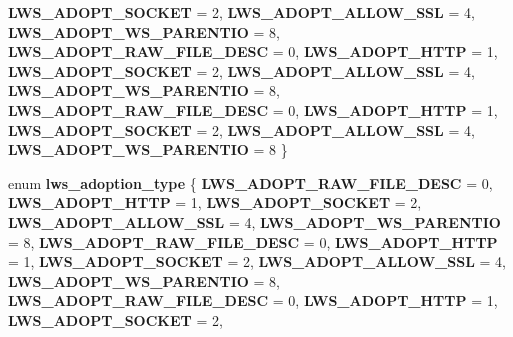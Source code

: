 \begin{DoxyCompactItemize}
{\bfseries L\+W\+S\+\_\+\+A\+D\+O\+P\+T\+\_\+\+S\+O\+C\+K\+ET} = 2, 
{\bfseries L\+W\+S\+\_\+\+A\+D\+O\+P\+T\+\_\+\+A\+L\+L\+O\+W\+\_\+\+S\+SL} = 4, 
{\bfseries L\+W\+S\+\_\+\+A\+D\+O\+P\+T\+\_\+\+W\+S\+\_\+\+P\+A\+R\+E\+N\+T\+IO} = 8, 
\newline
{\bfseries L\+W\+S\+\_\+\+A\+D\+O\+P\+T\+\_\+\+R\+A\+W\+\_\+\+F\+I\+L\+E\+\_\+\+D\+E\+SC} = 0, 
{\bfseries L\+W\+S\+\_\+\+A\+D\+O\+P\+T\+\_\+\+H\+T\+TP} = 1, 
{\bfseries L\+W\+S\+\_\+\+A\+D\+O\+P\+T\+\_\+\+S\+O\+C\+K\+ET} = 2, 
{\bfseries L\+W\+S\+\_\+\+A\+D\+O\+P\+T\+\_\+\+A\+L\+L\+O\+W\+\_\+\+S\+SL} = 4, 
\newline
{\bfseries L\+W\+S\+\_\+\+A\+D\+O\+P\+T\+\_\+\+W\+S\+\_\+\+P\+A\+R\+E\+N\+T\+IO} = 8, 
{\bfseries L\+W\+S\+\_\+\+A\+D\+O\+P\+T\+\_\+\+R\+A\+W\+\_\+\+F\+I\+L\+E\+\_\+\+D\+E\+SC} = 0, 
{\bfseries L\+W\+S\+\_\+\+A\+D\+O\+P\+T\+\_\+\+H\+T\+TP} = 1, 
{\bfseries L\+W\+S\+\_\+\+A\+D\+O\+P\+T\+\_\+\+S\+O\+C\+K\+ET} = 2, 
\newline
{\bfseries L\+W\+S\+\_\+\+A\+D\+O\+P\+T\+\_\+\+A\+L\+L\+O\+W\+\_\+\+S\+SL} = 4, 
{\bfseries L\+W\+S\+\_\+\+A\+D\+O\+P\+T\+\_\+\+W\+S\+\_\+\+P\+A\+R\+E\+N\+T\+IO} = 8
 \}
\item 
\mbox{\label{group__sock-adopt_ga7e944a23efbb50187d34c62fb841d071}} 
enum {\bfseries lws\+\_\+adoption\+\_\+type} \{ \newline
{\bfseries L\+W\+S\+\_\+\+A\+D\+O\+P\+T\+\_\+\+R\+A\+W\+\_\+\+F\+I\+L\+E\+\_\+\+D\+E\+SC} = 0, 
{\bfseries L\+W\+S\+\_\+\+A\+D\+O\+P\+T\+\_\+\+H\+T\+TP} = 1, 
{\bfseries L\+W\+S\+\_\+\+A\+D\+O\+P\+T\+\_\+\+S\+O\+C\+K\+ET} = 2, 
{\bfseries L\+W\+S\+\_\+\+A\+D\+O\+P\+T\+\_\+\+A\+L\+L\+O\+W\+\_\+\+S\+SL} = 4, 
\newline
{\bfseries L\+W\+S\+\_\+\+A\+D\+O\+P\+T\+\_\+\+W\+S\+\_\+\+P\+A\+R\+E\+N\+T\+IO} = 8, 
{\bfseries L\+W\+S\+\_\+\+A\+D\+O\+P\+T\+\_\+\+R\+A\+W\+\_\+\+F\+I\+L\+E\+\_\+\+D\+E\+SC} = 0, 
{\bfseries L\+W\+S\+\_\+\+A\+D\+O\+P\+T\+\_\+\+H\+T\+TP} = 1, 
{\bfseries L\+W\+S\+\_\+\+A\+D\+O\+P\+T\+\_\+\+S\+O\+C\+K\+ET} = 2, 
\newline
{\bfseries L\+W\+S\+\_\+\+A\+D\+O\+P\+T\+\_\+\+A\+L\+L\+O\+W\+\_\+\+S\+SL} = 4, 
{\bfseries L\+W\+S\+\_\+\+A\+D\+O\+P\+T\+\_\+\+W\+S\+\_\+\+P\+A\+R\+E\+N\+T\+IO} = 8, 
{\bfseries L\+W\+S\+\_\+\+A\+D\+O\+P\+T\+\_\+\+R\+A\+W\+\_\+\+F\+I\+L\+E\+\_\+\+D\+E\+SC} = 0, 
{\bfseries L\+W\+S\+\_\+\+A\+D\+O\+P\+T\+\_\+\+H\+T\+TP} = 1, 
\newline
{\bfseries L\+W\+S\+\_\+\+A\+D\+O\+P\+T\+\_\+\+S\+O\+C\+K\+ET} = 2, 

\end{DoxyCompactItemize}
